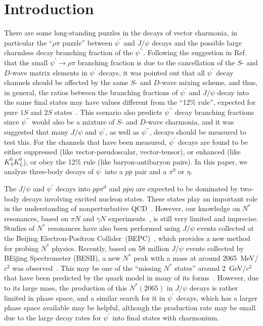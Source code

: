 \documentclass[prd,twocolumn,showpacs,amsmath,amssymb]{revtex4}
\newcommand{\pspp}{\psi^{\prime\prime}}
\newcommand{\psp}{\psi^\prime}
\newcommand{\jpsi}{J/\psi}
\newcommand{\piz}{\pi^0}
\newcommand{\rhopi}{\rho\pi}
\newcommand{\ppb}{p\overline{p}}
\newcommand{\kskl}{K^0_S K^0_L}
\newcommand{\pspto}{\psi^\prime \rightarrow }
\begin{document}

\maketitle

\section{Introduction}

There are some long-standing puzzles in the decays of vector
charmonia, in particular the ``$\rhopi$ puzzle'' between $\psp$
and $\jpsi$ decays and the possible large charmless decay
branching fraction of the $\pspp$. Following the suggestion in
Ref.~\cite{rosnersd} that the small $\pspto \rhopi$ branching
fraction is due to the cancellation of the $S$- and $D$-wave
matrix elements in $\psp$ decays, it was pointed out that all
$\psp$ decay channels should be affected by the same $S$- and
$D$-wave mixing scheme, and thus, in general, the ratios between
the branching fractions of $\psp$ and $\jpsi$ decay into the same
final states may have values different from the ``12\% rule'',
expected for pure $1S$ and $2S$ states~\cite{wymcharmless}. This
scenario also predicts $\pspp$ decay branching fractions since
$\pspp$ would also be a mixture of $S$- and $D$-wave charmonia,
and it was suggested that many $\jpsi$ and $\psp$, as well as
$\pspp$, decays should be measured to test this. For the channels
that have been measured, $\psp$ decays are found to be either
suppressed (like vector-pseudoscalar, vector-tensor), or enhanced
(like $\kskl$), or obey the 12\% rule (like baryon-antibaryon
pairs). In this paper, we analyze three-body decays of $\psp$ into
a $\ppb$ pair and a $\piz$ or $\eta$.

The $\jpsi$ and $\psp$ decays into $\ppb\piz$ and $\ppb\eta$ are
expected to be dominated by two-body decays involving excited
nucleon states. These states play an important role in the
understanding of nonperturbative
QCD~\cite{role1,role2,role3,role4}. However, our knowledge on
$N^*$ resonances, based on $\pi N$ and $\gamma N$
experiments~\cite{pdg}, is still very limited and imprecise.
Studies of $N^*$ resonances have also been performed using $\jpsi$
events collected at the Beijing Electron-Positron
Collider~(BEPC)~\cite{zounstar,jpsippeta,pnbarpi}, which provides
a new method for probing $N^*$ physics. Recently, based on 58
million $\jpsi$ events collected by BEijing Spectrometer (BESII),
a new $N^*$ peak with a mass at around 2065~MeV/$c^2$ was
observed~\cite{pnbarpi}. This may be one of the ``missing $N^*$
states'' around 2~GeV/$c^2$ that have been predicted by the quark
model in many of its forms~\cite{role2,model1,model2}.  However,
due to its large mass, the production of this $N^*(2065)$ in
$\jpsi$ decays is rather limited in phase space, and a similar
search for it in $\psp$ decays, which has a larger phase space
available may be helpful, although the production rate may be
small due to the large decay rates for $\psp$ into final states
with charmonium.
\end{document}
